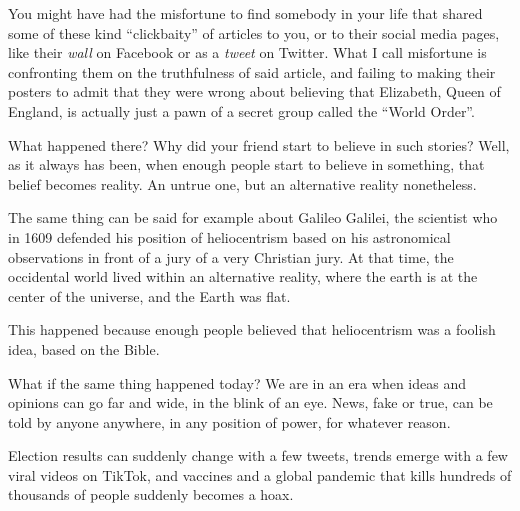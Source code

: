 You might have had the misfortune to find somebody in your life that shared some of these kind ``clickbaity'' of articles to you, or to their social media pages, like their \textit{wall} on Facebook or as a \textit{tweet} on Twitter. What I call misfortune is confronting them on the truthfulness of said article, and failing to making their posters to admit that they were wrong about believing that Elizabeth, Queen of England, is actually just a pawn of a secret group called the ``World Order''.

What happened there? Why did your friend start to believe in such stories? Well, as it always has been, when enough people start to believe in something, that belief becomes reality. An untrue one, but an alternative reality nonetheless.

The same thing can be said for example about Galileo Galilei, the scientist who in 1609 defended his position of heliocentrism based on his astronomical observations in front of a jury of a very Christian jury. At that time, the occidental world lived within an alternative reality, where the earth is at the center of the universe, and the Earth was flat.

This happened because enough people believed that heliocentrism was a foolish idea, based on the Bible.

What if the same thing happened today? We are in an era when ideas and opinions can go far and wide, in the blink of an eye. News, fake or true, can be told by anyone anywhere, in any position of power, for whatever reason.

Election results can suddenly change with a few tweets, trends emerge with a few viral videos on TikTok, and vaccines and a global pandemic that kills hundreds of thousands of people suddenly becomes a hoax.
